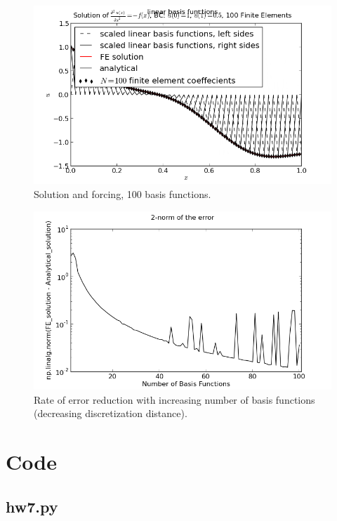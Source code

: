 \documentclass[10pt]{article}
\newcommand{\code}[2]{
  \subsection*{#1}
  
  \vspace{2em}
}
\begin{document}
\begin{figure}[ht]
 \centering
 \includegraphics[width=\columnwidth,keepaspectratio=true]{./hw7-solution_and_forcing-N100.png}
 \caption{Solution and forcing, 100 basis functions.}
 \label{fig:sf100}
\end{figure}

\begin{figure}[ht]
 \centering
 \includegraphics[width=\columnwidth,keepaspectratio=true]{./hw7-error_rate.png}
 \caption{Rate of error reduction with increasing number of basis functions (decreasing discretization distance).}
 \label{fig:errorrate}
\end{figure}

\clearpage

\section{Code}

\code{hw7.py}{hw7.py}
\end{document}
